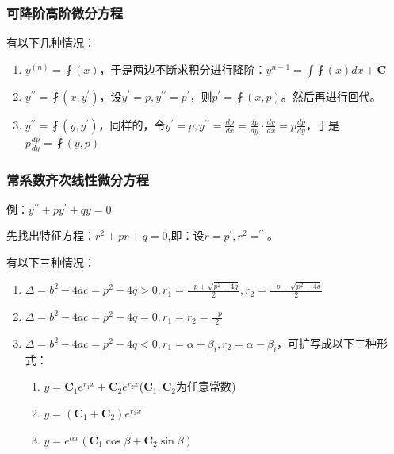 \documentclass[UTF8]{ctexbook}
\newcommand{\derivative}{^\prime}
\newcommand{\doubleDerivative}{^{\prime\prime}}
\newcommand{\defFunction}[1]{\fint(#1)}
\newcommand{\mathConstant}{\mathbf{C}}
\begin{document}
{{{{}%

\subsubsection{可降阶高阶微分方程}{
  有以下几种情况：

  \begin{enumerate}
    \item $y^{(n)} = \defFunction{x}$，于是两边不断求积分进行降阶：$y^{n-1} = \int \defFunction{x}dx + \mathConstant$
    \item $y\doubleDerivative = \defFunction{x,y\derivative}$，设$y\derivative = p,y\doubleDerivative = p\derivative$，则$p\derivative = \defFunction{x,p}$。然后再进行回代。
    \item $y\doubleDerivative = \defFunction{y,y\derivative}$，同样的，令$y\derivative = p, y\doubleDerivative = \frac{dp}{dx} = \frac{dp}{dy}\cdot\frac{dy}{dx} = p\frac{dp}{dy}$，于是$p\frac{dp}{dy} = \defFunction{y,p}$
  \end{enumerate}

}%

\subsubsection{常系数齐次线性微分方程}{
  例：$y\doubleDerivative + py\derivative + qy = 0$

  先找出特征方程：$r^2 + pr + q = 0$,即：设$r = p\derivative,r^2 = \doubleDerivative$。

  有以下三种情况：
  \begin{enumerate}
    \item $\Delta = b^2 - 4ac = p^2 - 4q > 0,r_1 = \frac{-p + \sqrt{p^2 - 4q}}{2}, r_2 = \frac{-p - \sqrt{p^2 - 4q}}{2}$
    \item $\Delta = b^2 - 4ac = p^2 - 4q = 0,r_1 = r_2 = \frac{-p}{2}$
    \item {$\Delta = b^2 - 4ac = p^2 - 4q < 0,r_1 = \alpha + \beta_i, r_2 = \alpha - \beta_i$，可扩写成以下三种形式：

          \begin{enumerate}
            \item $y = \mathConstant_1e^{r_1x} + \mathConstant_2e^{r_2x}$($\mathConstant_1,\mathConstant_2$为任意常数)
            \item $y = (\mathConstant_1 + \mathConstant_2)e^{r_1x}$
            \item $y = e^{\alpha x}(\mathConstant_1\cos\beta + \mathConstant_2\sin\beta)$
          \end{enumerate}
          }
  \end{enumerate}

}}}}
\end{document}
